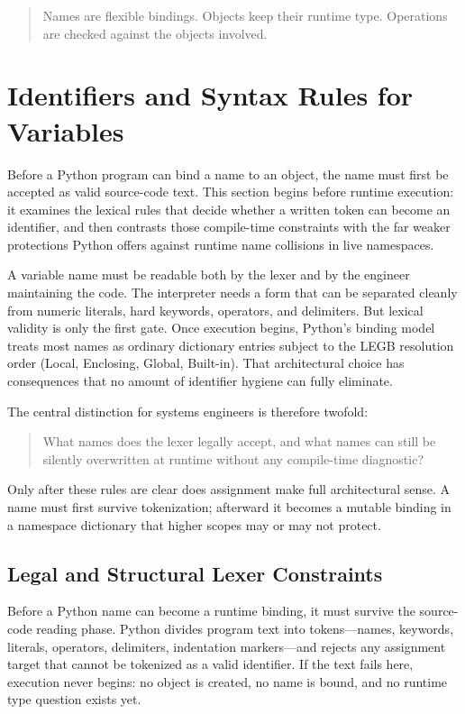 \documentclass[a4paper,twoside]{report}
\begin{document}
\begin{quote}
Names are flexible bindings. Objects keep their runtime type. Operations are checked against the objects involved.
\end{quote}


\section{Identifiers and Syntax Rules for Variables}

Before a Python program can bind a name to an object, the name must first be accepted as valid source-code text. This section begins before runtime execution: it examines the lexical rules that decide whether a written token can become an identifier, and then contrasts those compile-time constraints with the far weaker protections Python offers against runtime name collisions in live namespaces.

A variable name must be readable both by the lexer and by the engineer maintaining the code. The interpreter needs a form that can be separated cleanly from numeric literals, hard keywords, operators, and delimiters. But lexical validity is only the first gate. Once execution begins, Python's binding model treats most names as ordinary dictionary entries subject to the LEGB resolution order (Local, Enclosing, Global, Built-in). That architectural choice has consequences that no amount of identifier hygiene can fully eliminate.

The central distinction for systems engineers is therefore twofold:

\begin{quote}
What names does the lexer legally accept, and what names can still be silently overwritten at runtime without any compile-time diagnostic?
\end{quote}

Only after these rules are clear does assignment make full architectural sense. A name must first survive tokenization; afterward it becomes a mutable binding in a namespace dictionary that higher scopes may or may not protect.


\subsection{Legal and Structural Lexer Constraints}

Before a Python name can become a runtime binding, it must survive the source-code reading phase. Python divides program text into tokens---names, keywords, literals, operators, delimiters, indentation markers---and rejects any assignment target that cannot be tokenized as a valid identifier. If the text fails here, execution never begins: no object is created, no name is bound, and no runtime type question exists yet.
\end{document}
